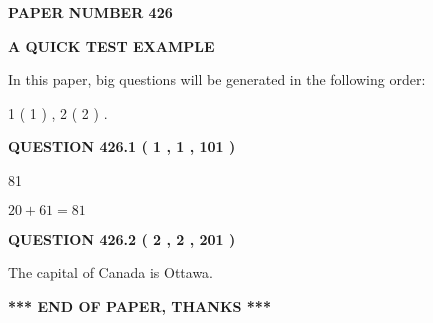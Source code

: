 \documentclass[12pt]{article}
\begin{document}
   
\newpage 
\setcounter{page}{ 
   426001 } 
   
   
   
   
 {\textbf{ \Large{ PAPER NUMBER  426  }}}
   
   
\vspace{0.2in}
   
   
   
   
   
   
 \vspace{0.2in}
{\LARGE {\textbf{ A QUICK TEST EXAMPLE}}}
   
   
   
\vspace{0.2in}
   
In this paper, big questions will be generated in the following order: 
   
   
   1 ( 1 )
 ,
   2 ( 2 )
 .
  
\vspace{0.2in}
  
{\textbf{\Large{QUESTION
426.1 
 ( 1 , 1 , 101 )
}}}
  
  
 
 
\noindent{}

81
 
 
 
 
\noindent{}

$ %
20 +  %
61=   %
81$
 
 
  
\vspace{0.2in}
  
{\textbf{\Large{QUESTION
426.2 
 ( 2 , 2 , 201 )
}}}
  
  
 
 
\noindent{}
 
 
The capital of Canada is Ottawa.
 
 
 
 
   
   
 \vspace{0.2in}
 
   
   
   
   
\vspace{1.0in} 
{\textbf{\large{ *** END OF PAPER, THANKS *** }}} 
   
\end{document}
